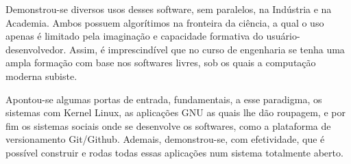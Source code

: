 \documentclass[
12pt,				%
openright,			%
oneside,			%
a4paper,			%
brazil,				%
english,			%
]{abntex2}
\begin{document}
Demonstrou-se diversos usos desses software, sem paralelos, na
Indústria e na Academia. Ambos possuem algorítimos na fronteira da
ciência, a qual o uso apenas é limitado pela imaginação e capacidade
formativa do usuário-desenvolvedor. Assim, é imprescindível que no
curso de engenharia se tenha uma ampla formação com base nos softwares
livres, sob os quais a computação moderna subiste.

Apontou-se algumas portas de entrada, fundamentais, a esse paradigma,
os sistemas com Kernel Linux, as aplicações GNU as quais lhe dão
roupagem, e por fim os sistemas sociais onde se desenvolve os
softwares, como a plataforma de versionamento Git/Github. Ademais,
demonstrou-se, com efetividade, que é possível construir e rodas todas
essas aplicações num sistema totalmente aberto.


\end{document}
